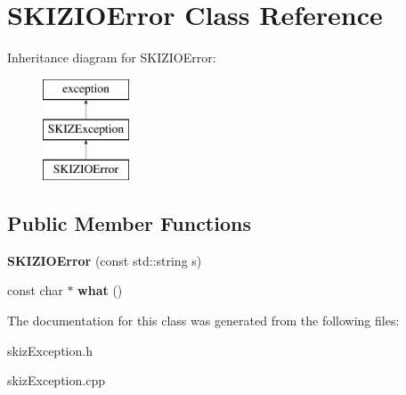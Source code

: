 \hypertarget{classSKIZIOError}{}\section{S\+K\+I\+Z\+I\+O\+Error Class Reference}
\label{classSKIZIOError}
Inheritance diagram for S\+K\+I\+Z\+I\+O\+Error\+:\begin{figure}[H]
\begin{center}
\leavevmode
\includegraphics[height=3.000000cm]{classSKIZIOError}
\end{center}
\end{figure}
\subsection*{Public Member Functions}
\begin{DoxyCompactItemize}
\item 
\mbox{\label{classSKIZIOError_aa9098edcf36cbca77f3c773b8ac03f64}} 
{\bfseries S\+K\+I\+Z\+I\+O\+Error} (const std\+::string s)
\item 
\mbox{\label{classSKIZIOError_adfb0975984f236bf9fdce131cff8637d}} 
const char $\ast$ {\bfseries what} ()
\end{DoxyCompactItemize}


The documentation for this class was generated from the following files\+:\begin{DoxyCompactItemize}
\item 
skiz\+Exception.\+h\item 
skiz\+Exception.\+cpp\end{DoxyCompactItemize}
